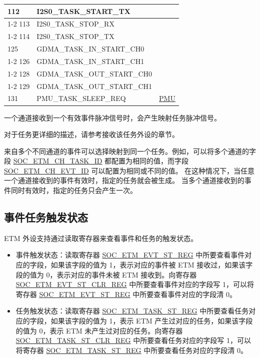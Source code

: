 \documentclass[main\_\_CN.tex]{subfiles}
\begin{document}
\begin{longtable}{ | l | l | l | }
112 & I2S0\_TASK\_START\_TX   & \\ \cline{1-2}
113 & I2S0\_TASK\_STOP\_RX    & \\ \cline{1-2}
114 & I2S0\_TASK\_STOP\_TX    & \\ \hline
125 & GDMA\_TASK\_IN\_START\_CH0    & \nameref{mod:dma}  \\ \cline{1-2}
126 & GDMA\_TASK\_IN\_START\_CH1    & \\ \cline{1-2}
128 & GDMA\_TASK\_OUT\_START\_CH0   & \\ \cline{1-2}
129 & GDMA\_TASK\_OUT\_START\_CH1   & \\ \hline
131 & PMU\_TASK\_SLEEP\_REQ  & \hyperref[mod:lowpowm]{PMU} \\ \hline
\end{longtable}

一个通道接收到一个有效事件脉冲信号时，会产生映射任务脉冲信号。

对于任务更详细的描述，请参考接收该任务外设的章节。

来自多个不同通道的事件可以选择映射到同一个任务。例如，可以将多个通道的字段 \hyperref[fielddesc:SOCETMCH0TASKID]{SOC\_ETM\_CH\_TASK\_ID} 都配置为相同的值，而字段 \hyperref[fielddesc:SOCETMCH0EVTID]{SOC\_ETM\_CH\_EVT\_ID} 可以配置为相同或不同的值。 在这种情况下，当任意一个通道接收到的事件有效时，指定的任务就会被生成。 当多个通道接收到的事件同时有效时，指定的任务只会产生一次。

\subsection{事件任务触发状态}

ETM 外设支持通过读取寄存器来查看事件和任务的触发状态。

\begin{itemize}
    \item 事件触发状态：读取寄存器 \hyperref[regdesc:SOCETMEVTST0REG]{SOC\_ETM\_EVT\_ST\_REG} 中所要查看事件对应的字段，如果该字段的值为 1，表示对应的事件被 ETM 接收过，如果该字段的值为 0，表示对应的事件未被 ETM 接收到。向寄存器 \hyperref[regdesc:SOCETMEVTST0CLRREG]{SOC\_ETM\_EVT\_ST\_CLR\_REG} 中所要查看事件对应的字段写 1，可以将寄存器 \hyperref[regdesc:SOCETMEVTST0REG]{SOC\_ETM\_EVT\_ST\_REG} 中所要查看事件对应的字段清 0。
    \item 任务触发状态：读取寄存器 \hyperref[regdesc:SOCETMTASKST0REG]{SOC\_ETM\_TASK\_ST\_REG} 中所要查看任务对应的字段，如果该字段的值为 1，表示 ETM 产生过对应的任务，如果该字段的值为 0，表示 ETM 未产生过对应的任务。向寄存器 \hyperref[regdesc:SOCETMTASKST0CLRREG]{SOC\_ETM\_TASK\_ST\_CLR\_REG} 中所要查看任务对应的字段写 1，可以将寄存器 \hyperref[regdesc:SOCETMTASKST0REG]{SOC\_ETM\_TASK\_ST\_REG} 中所要查看任务对应的字段清 0。
\end{itemize}
\end{document}
